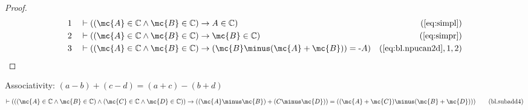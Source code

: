 \begin{proof}
\begin{align}
  1 &&  & \vdash ( ( \mc{A} \in \mathbb{C} \wedge \mc{B} \in \mathbb{C} ) \rightarrow A
    \in \mathbb{C} )&(\mbox{\ref{eq:simpl}})\notag
  \\ 2 &&  & \vdash ( ( \mc{A} \in \mathbb{C} \wedge \mc{B} \in \mathbb{C} ) \rightarrow
    \mc{B} \in \mathbb{C} )&(\mbox{\ref{eq:simpr}})\notag
  \\ 3 &&  & \vdash ( ( \mc{A} \in \mathbb{C} \wedge \mc{B} \in \mathbb{C} ) \rightarrow
    ( \mc{B} \minus ( \mc{A} + \mc{B} ) ) = \textrm{-} A
    )&(\mbox{\ref{eq:bl.npucan2d}},1,2)\notag
\end{align}
\end{proof}

\begin{lemma} {Associativity: $( a \minus b ) + ( c
\minus d ) = ( a + c ) \minus ( b + d )$}
\begin{align}
\vdash ( ( ( \mc{A} \in \mathbb{C} \wedge \mc{B} \in \mathbb{C} ) \wedge ( \mc{C} \in
    \mathbb{C} \wedge \mc{D} \in \mathbb{C} ) ) \rightarrow ( ( \mc{A} \minus \mc{B} ) + ( C
    \minus \mc{D} ) ) = ( ( \mc{A} + \mc{C} ) \minus ( \mc{B} + \mc{D} ) )
    )\label{eq:bl.subadd4}\tag{bl.subadd4}
\end{align}
\end{lemma}



